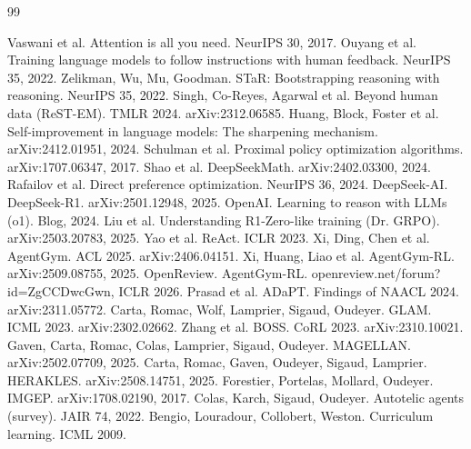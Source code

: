 \documentclass[11pt,a4paper]{article}
\begin{document}
\newpage



\newpage

\begin{thebibliography}{99}

 Vaswani et al. Attention is all you need. NeurIPS 30, 2017.
 Ouyang et al. Training language models to follow instructions with human feedback. NeurIPS 35, 2022.
 Zelikman, Wu, Mu, Goodman. STaR: Bootstrapping reasoning with reasoning. NeurIPS 35, 2022.
 Singh, Co-Reyes, Agarwal et al. Beyond human data (ReST-EM). TMLR 2024. arXiv:2312.06585.
 Huang, Block, Foster et al. Self-improvement in language models: The sharpening mechanism. arXiv:2412.01951, 2024.
 Schulman et al. Proximal policy optimization algorithms. arXiv:1707.06347, 2017.
 Shao et al. DeepSeekMath. arXiv:2402.03300, 2024.
 Rafailov et al. Direct preference optimization. NeurIPS 36, 2024.
 DeepSeek-AI. DeepSeek-R1. arXiv:2501.12948, 2025.
 OpenAI. Learning to reason with LLMs (o1). Blog, 2024.
 Liu et al. Understanding R1-Zero-like training (Dr. GRPO). arXiv:2503.20783, 2025.
 Yao et al. ReAct. ICLR 2023.
 Xi, Ding, Chen et al. AgentGym. ACL 2025. arXiv:2406.04151.
 Xi, Huang, Liao et al. AgentGym-RL. arXiv:2509.08755, 2025.
 OpenReview. AgentGym-RL. openreview.net/forum?id=ZgCCDwcGwn, ICLR 2026.
 Prasad et al. ADaPT. Findings of NAACL 2024. arXiv:2311.05772.
 Carta, Romac, Wolf, Lamprier, Sigaud, Oudeyer. GLAM. ICML 2023. arXiv:2302.02662.
 Zhang et al. BOSS. CoRL 2023. arXiv:2310.10021.
 Gaven, Carta, Romac, Colas, Lamprier, Sigaud, Oudeyer. MAGELLAN. arXiv:2502.07709, 2025.
 Carta, Romac, Gaven, Oudeyer, Sigaud, Lamprier. HERAKLES. arXiv:2508.14751, 2025. %
 Forestier, Portelas, Mollard, Oudeyer. IMGEP. arXiv:1708.02190, 2017.
 Colas, Karch, Sigaud, Oudeyer. Autotelic agents (survey). JAIR 74, 2022.
 Bengio, Louradour, Collobert, Weston. Curriculum learning. ICML 2009.

\end{thebibliography}
\end{document}
